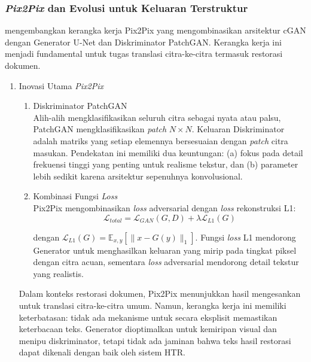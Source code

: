 \subsubsection{\textit{Pix2Pix} dan Evolusi untuk Keluaran Terstruktur}
\label{subsubsec:pix2pix-evolution}


\textcite{isola2017} mengembangkan kerangka kerja Pix2Pix yang mengombinasikan arsitektur cGAN dengan Generator U-Net dan Diskriminator PatchGAN. Kerangka kerja ini menjadi fundamental untuk tugas translasi citra-ke-citra termasuk restorasi dokumen.

\begin{enumerate}[leftmargin=*, labelindent=0pt, itemsep=1ex, topsep=0pt]

\item Inovasi Utama \textit{Pix2Pix}
\label{para:pix2pix-inovasi}

\begin{enumerate}[leftmargin=1.5em, labelsep=0.5em, itemindent=0pt, noitemsep, topsep=0pt, label=\alph*.]
      \item Diskriminator PatchGAN \mbox{}\\[0.1em]
            Alih-alih mengklasifikasikan seluruh citra sebagai nyata atau palsu, PatchGAN mengklasifikasikan \textit{patch} $N \times N$. Keluaran Diskriminator adalah matriks yang setiap elemennya bersesuaian dengan \textit{patch} citra masukan. Pendekatan ini memiliki dua keuntungan: (a) fokus pada detail frekuensi tinggi yang penting untuk realisme tekstur, dan (b) parameter lebih sedikit karena arsitektur sepenuhnya konvolusional.

      \item Kombinasi Fungsi \textit{Loss} \mbox{}\\[0.1em]
            Pix2Pix mengombinasikan \textit{loss} adversarial dengan \textit{loss} rekonstruksi L1:
            \begin{equation}
                  \mathcal{L}_{total} = \mathcal{L}_{GAN}(G, D) + \lambda \mathcal{L}_{L1}(G)
            \end{equation}

            dengan $\mathcal{L}_{L1}(G) = \mathbb{E}_{x, y}[\|x - G(y)\|_1]$. Fungsi \textit{loss} L1 mendorong Generator untuk menghasilkan keluaran yang mirip pada tingkat piksel dengan citra acuan, sementara \textit{loss} adversarial mendorong detail tekstur yang realistis.
\end{enumerate}

Dalam konteks restorasi dokumen, Pix2Pix menunjukkan hasil mengesankan untuk translasi citra-ke-citra umum. Namun, kerangka kerja ini memiliki keterbatasan: tidak ada mekanisme untuk secara eksplisit memastikan keterbacaan teks. Generator dioptimalkan untuk kemiripan visual dan menipu diskriminator, tetapi tidak ada jaminan bahwa teks hasil restorasi dapat dikenali dengan baik oleh sistem HTR.

\end{enumerate}

